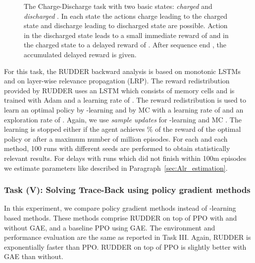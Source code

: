 \documentclass{article}
\begin{document}
\begin{appendices}
\begin{figure}[htp]
{ }
\caption{The Charge-Discharge task with two basic states: {\em charged}  and 
 {\em discharged} .
 In each state the actions charge  leading to 
 the charged state  
 and discharge  leading to discharged state  are possible. 
 Action  in the discharged state  leads to a small immediate reward of  and in the charged state  
 to a delayed reward of . 
 After sequence end , the accumulated delayed reward  is given. \label{fig:charge}}
\end{figure}


For this task, 
the RUDDER backward analysis is based on 
monotonic LSTMs
and on layer-wise relevance propagation (LRP). 
The reward redistribution provided by RUDDER uses an 
LSTM which consists of  memory cells 
and is trained with Adam and a learning rate of . 
The reward redistribution is used to learn an optimal policy by -learning and by MC
with a learning rate of  and an exploration rate of . 
Again, we use {\em sample updates} for -learning and MC \cite{Sutton:18book}.
The learning is stopped either if the agent achieves \% of the reward of the optimal policy or after a maximum number of  million episodes. 
For each  and each method, 100 runs with different seeds are performed to obtain statistically relevant results. For delays with runs which did not finish within 100m episodes we estimate parameters like described in Paragraph~\ref{sec:Alr_estimation}. 


\subsubsection{Task (V): Solving Trace-Back using policy gradient methods}
In this experiment, we compare policy gradient methods instead of -learning based methods. 
These methods comprise RUDDER on top of PPO with and without GAE, and a baseline PPO using GAE.
The environment and performance evaluation are the same as reported in Task III.
Again, RUDDER is exponentially faster than PPO. RUDDER on top of PPO is slightly better with GAE than without.


\end{appendices}
\end{document}
